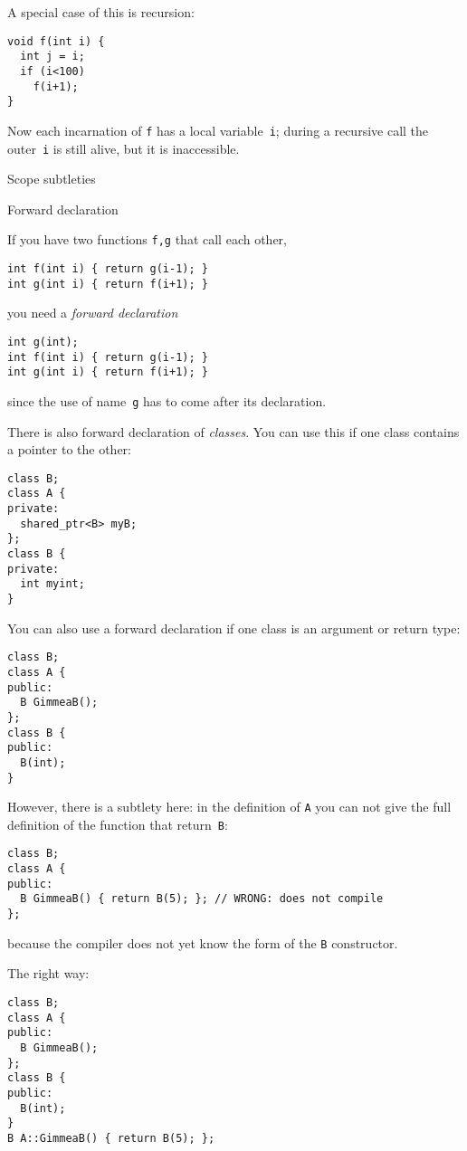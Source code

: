 A special case of this is recursion:
\begin{lstlisting}
void f(int i) {
  int j = i;
  if (i<100)
    f(i+1);
}
\end{lstlisting}
Now each incarnation of \lstinline{f} has a local variable~\lstinline{i}; during a
recursive call the outer~\lstinline{i} is still alive, but it is inaccessible.

 {Scope subtleties}

 {Forward declaration}

If you have two functions \lstinline{f,g} that call each other,
\begin{lstlisting}
int f(int i) { return g(i-1); }
int g(int i) { return f(i+1); }
\end{lstlisting}
you need a
%
\emph{forward declaration}
%
\begin{lstlisting}
int g(int);
int f(int i) { return g(i-1); }
int g(int i) { return f(i+1); }
\end{lstlisting}
since the use of name~\lstinline{g} has to come after its declaration.

There is also forward declaration of
\emph{classes}.
You can use this if one class contains a pointer to the other:
\begin{lstlisting}
class B;
class A {
private:
  shared_ptr<B> myB;
};
class B {
private:
  int myint;
}
\end{lstlisting}

You can also use a forward declaration if one class is an argument or return type:
\begin{lstlisting}
class B;
class A {
public:
  B GimmeaB();
};
class B {
public:
  B(int);
}
\end{lstlisting}
However, there is a subtlety here:
in the definition of \lstinline{A} you can not give the full definition
of the function that return~\lstinline{B}:
\begin{lstlisting}
class B;
class A {
public:
  B GimmeaB() { return B(5); }; // WRONG: does not compile
};
\end{lstlisting}

because the compiler does not yet know the form of the \lstinline{B} constructor.

The right way:
\begin{lstlisting}
class B;
class A {
public:
  B GimmeaB();
};
class B {
public:
  B(int);
}
B A::GimmeaB() { return B(5); };
\end{lstlisting}

